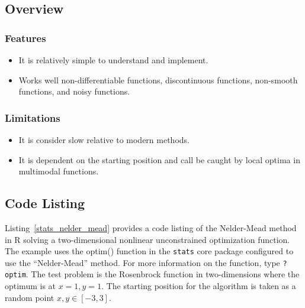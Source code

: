 \subsection{Overview}

\subsubsection{Features}

\begin{itemize}
	\item It is relatively simple to understand and implement.
	\item Works well non-differentiable functions, discontinuous functions, non-smooth functions, and noisy functions.
\end{itemize}

\subsubsection{Limitations}

\begin{itemize}
	\item It is consider slow relative to modern methods.
	\item It is dependent on the starting position and call be caught by local optima in multimodal functions.
\end{itemize}

\subsection{Code Listing}
Listing~\ref{stats_nelder_mead} provides a code listing of the Nelder-Mead method in R solving a two-dimensional nonlinear unconstrained optimization function.
The example uses the {optim()} function in the \texttt{stats} core package configured to use the ``Nelder-Mead'' method. For more information on the function, type \texttt{?optim}.
The test problem is the Rosenbrock function in two-dimensions where the optimum is at $x=1, y=1$. The starting position for the algorithm is taken as a random point $x,y \in [-3,3]$.





